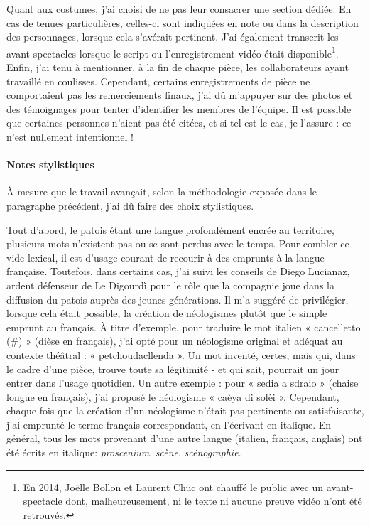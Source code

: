 Quant aux costumes, j'ai choisi de ne pas leur consacrer une section dédiée. En cas de tenues particulières, celles-ci sont indiquées en note ou dans la description des personnages, lorsque cela s’avérait pertinent.
J'ai également transcrit les avant-spectacles lorsque le script ou l'enregistrement vidéo était disponible\footnote{ En 2014, Jo\"elle Bollon et Laurent Chuc ont chauffé le public avec un avant-spectacle dont, malheureusement, ni le texte ni aucune preuve vidéo n'ont été retrouvés.}. Enfin, j’ai tenu à mentionner, à la fin de chaque pièce, les collaborateurs ayant travaillé en coulisses. Cependant, certains enregistrements de pièce ne comportaient pas les remerciements finaux, j’ai dû m’appuyer sur des photos et des témoignages pour tenter d’identifier les membres de l’équipe. Il est possible que certaines personnes n’aient pas été citées, et si tel est le cas, je l’assure : ce n’est nullement intentionnel !

\paragraph*{Notes stylistiques}
À mesure que le travail avançait, selon la méthodologie exposée dans le paragraphe précédent, j'ai dû faire des choix stylistiques.

Tout d’abord, le patois étant une langue profondément encrée au territoire, plusieurs mots n'existent pas ou se sont perdus avec le temps. Pour combler ce vide lexical, il est d'usage courant de recourir à des emprunts à la langue française. Toutefois, dans certains cas, j'ai suivi les conseils de Diego Lucianaz, ardent défenseur de Le Digourdì pour le rôle que la compagnie joue dans la diffusion du patois auprès des jeunes générations. Il m'a suggéré de privilégier, lorsque cela était possible, la création de néologismes plutôt que le simple emprunt au français. À titre d'exemple, pour traduire le mot italien « cancelletto (\#) » (dièse en français), j’ai opté pour un néologisme original et adéquat au contexte théâtral : « petchouda\-cllen\-da ». Un mot inventé, certes, mais qui, dans le cadre d’une pièce, trouve toute sa légitimité - et qui sait, pourrait un jour entrer dans l’usage quotidien. Un autre exemple : pour « sedia a sdraio » (chaise longue en français), j'ai proposé le néologisme « caèya di solèi ».
Cependant, chaque fois que la création d’un néologisme n’était pas pertinente ou satisfaisante, j’ai emprunté le terme français correspondant, en l’écrivant en italique. En général, tous les mots provenant d'une autre langue (italien, français, anglais) ont été écrits en italique: \textit{proscenium}, \textit{scène}, \textit{scénographie}.

